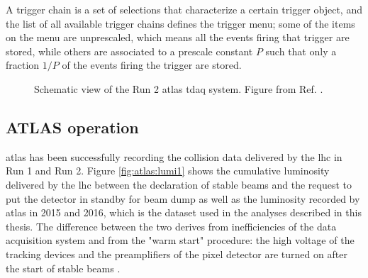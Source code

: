 A trigger chain is a set of selections that characterize a certain trigger object, and the list of all available trigger chains defines the trigger menu; some of the items on the menu are unprescaled, which means all the events firing that trigger are stored, while others are associated to a prescale constant $P$ such that only a fraction $1/P$ of the events firing the trigger are stored.

\begin{figure}[ht]
\centering
{}
\caption{Schematic view of the Run 2 \gls{atlas} \gls{tdaq} system. Figure from Ref. \cite{Aaboud:2016leb}.}
\label{fig:atlas:trig}
\end{figure}


\subsection{ATLAS operation}

\gls{atlas} has been successfully recording the collision data delivered by the \gls{lhc} in Run 1 and Run 2. Figure \ref{fig:atlas:lumi1} shows the cumulative luminosity delivered by the \gls{lhc} between the declaration of stable beams and the request to put the detector in standby for beam dump  as well as the luminosity recorded by \gls{atlas} in 2015 and 2016, which is the dataset used in the analyses described in this thesis. The difference between the two derives from inefficiencies of the data acquisition system and from the "warm start" procedure: the high voltage of the tracking devices and the preamplifiers of the pixel detector are turned on after the start of stable beams \cite{LumiTwiki}.

